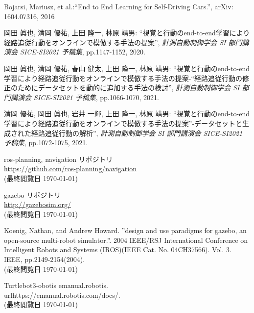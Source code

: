 \documentclass[10pt]{ujarticle}
\begin{document}
    \vspace{5truemm}
    {\footnotesize
        \begin{thebibliography}{99}

            Bojarsi, Mariusz, et al.:``End to End Learning for Self-Driving Cars.'', arXiv: 1604.07316, 2016
            
            岡田 眞也, 清岡 優祐, 上田 隆一, 林原 靖男: ``視覚と行動のend-to-end学習により経路追従行動をオンラインで模倣する手法の提案'', \textit{計測自動制御学会 SI 部門講演会 SICE-SI2021 予稿集}, pp.1147-1152, 2020.

            岡田 眞也, 清岡 優祐, 春山 健太, 上田 隆一, 林原 靖男: ``視覚と行動のend-to-end学習により経路追従行動をオンラインで模倣する手法の提案-“経路追従行動の修正のためにデータセットを動的に追加する手法の検討'', \textit{計測自動制御学会 SI 部門講演会 SICE-SI2021 予稿集}, pp.1066-1070, 2021.

            清岡 優祐, 岡田 眞也, 岩井 一輝, 上田 隆一, 林原 靖男: ``視覚と行動のend-to-end学習により経路追従行動をオンラインで模倣する手法の提案''-データセットと生成された経路追従行動の解析'', \textit{計測自動制御学会 SI 部門講演会 SICE-SI2021 予稿集}, pp.1072-1075, 2021.

            ros-planning, navigation リポジトリ\\
            \url{https://github.com/ros-planning/navigation}\\
            (最終閲覧日 \today)

            gazebo リポジトリ\\
            \url{http://gazebosim.org/}\\
            (最終閲覧日 \today)

            Koenig, Nathan, and Andrew Howard. ”design and use paradigms for gazebo, an open-source multi-robot simulator.”. 2004 IEEE/RSJ International Conference on Intelligent Robots and Systems (IROS)(IEEE Cat. No. 04CH37566). Vol. 3. IEEE, pp.2149-2154(2004).\\
            (最終閲覧日 \today)

            Turtlebot3-obotis emanual.robotis.\\
            url{https://emanual.robotis.com/docs/.}\\
            (最終閲覧日 \today)
            
        \end{thebibliography}
    }
\end{document}
